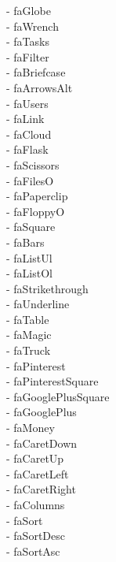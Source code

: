 \documentclass[%
               doublesided,
               paper=a4,
               fontsize=10pt
              ]{my-resume}
\begin{document}
\faGlobe - faGlobe\\ \faWrench - faWrench\\ \faTasks - faTasks\\ \faFilter - faFilter\\ \faBriefcase - faBriefcase\\ \faArrowsAlt - faArrowsAlt\\ \faUsers - faUsers\\ \faLink - faLink\\ \faCloud - faCloud\\ \faFlask - faFlask\\ \faScissors - faScissors\\ \faFilesO - faFilesO\\ \faPaperclip - faPaperclip\\ \faFloppyO - faFloppyO\\ \faSquare - faSquare\\ \faBars - faBars\\ \faListUl - faListUl\\ \faListOl - faListOl\\ \faStrikethrough - faStrikethrough\\ \faUnderline - faUnderline\\ \faTable - faTable\\ \faMagic - faMagic\\ \faTruck - faTruck\\ \faPinterest - faPinterest\\ \faPinterestSquare - faPinterestSquare\\ \faGooglePlusSquare - faGooglePlusSquare\\ \faGooglePlus - faGooglePlus\\ \faMoney - faMoney\\ \faCaretDown - faCaretDown\\ \faCaretUp - faCaretUp\\ \faCaretLeft - faCaretLeft\\ \faCaretRight - faCaretRight\\ \faColumns - faColumns\\ \faSort - faSort\\ \faSortDesc - faSortDesc\\ \faSortAsc - faSortAsc\\ \faEnvelope 
\end{document}
